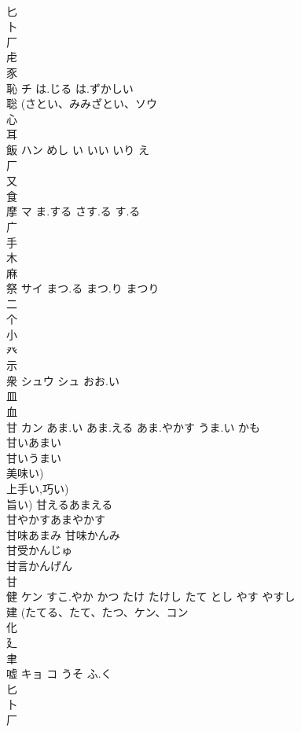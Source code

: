 \documentclass[8pt]{extreport}
\begin{document}
\begin{CJK}{UTF8}{min}
\\	匕 
\\	卜 
\\	厂 
\\	虍 
\\	豕 
\\	恥	チ	は.じる は.ずかしい	
\\	聡 (さとい、みみざとい、ソウ 
\\	心 
\\	耳 
\\	飯	ハン	めし い いい いり え	
\\	厂 
\\	又 
\\	食 
\\	摩	マ	ま.する さす.る す.る	
\\	广 
\\	手 
\\	木 
\\	麻 
\\	祭	サイ	まつ.る まつ.り まつり	
\\	二 
\\	个 
\\	小 
\\	癶 
\\	示 
\\	衆	シュウ シュ	おお.い	
\\	皿 
\\	血 
\\	甘	カン	あま.い あま.える あま.やかす うま.い かも	
\\	甘いあまい 
\\	甘いうまい 
\\	美味い) 
\\	上手い,巧い) 
\\	旨い) 甘えるあまえる 
\\	甘やかすあまやかす 
\\	甘味あまみ 甘味かんみ 
\\	甘受かんじゅ 
\\	甘言かんげん 
\\	甘 
\\	健	ケン	すこ.やか かつ たけ たけし たて とし やす やすし	
\\	建 (たてる、たて、たつ、ケン、コン 
\\	化 
\\	廴 
\\	聿 
\\	嘘	キョ コ	うそ ふ.く	
\\	匕 
\\	卜 
\\	厂 

\end{CJK}
\end{document}
